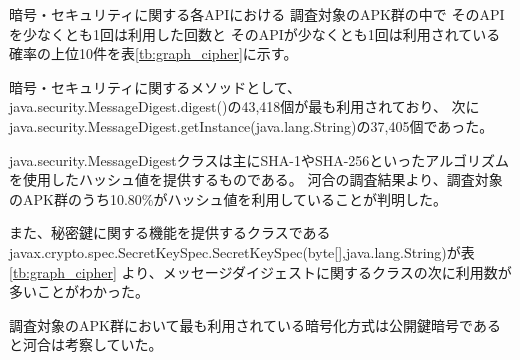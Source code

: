 暗号・セキュリティに関する各APIにおける
調査対象のAPK群の中で
そのAPIを少なくとも1回は利用した回数と
そのAPIが少なくとも1回は利用されている確率の上位10件を表\ref{tb:graph_cipher}に示す。

暗号・セキュリティに関するメソッドとして、
java.security.MessageDigest.digest()の43,418個が最も利用されており、
次にjava.security.MessageDigest.getInstance(java.lang.String)の37,405個であった。

java.security.MessageDigestクラスは主にSHA-1やSHA-256といったアルゴリズムを使用したハッシュ値を提供するものである。
河合の調査結果より、調査対象のAPK群のうち10.80\%がハッシュ値を利用していることが判明した。

また、秘密鍵に関する機能を提供するクラスであるjavax.crypto.spec.SecretKeySpec.SecretKeySpec(byte[],java.lang.String)が表\ref{tb:graph_cipher}
より、メッセージダイジェストに関するクラスの次に利用数が多いことがわかった。

調査対象のAPK群において最も利用されている暗号化方式は公開鍵暗号であると河合は考察していた。

